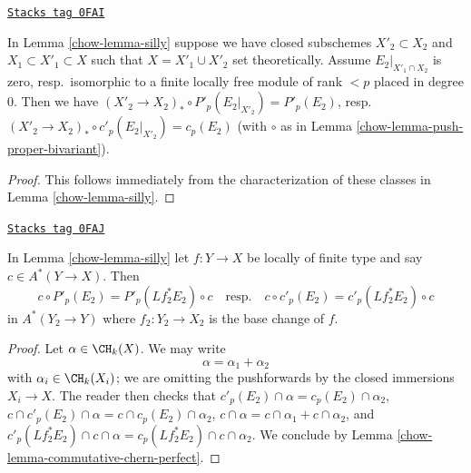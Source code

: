 \begin{lemma}
\label{chow-lemma-silly-shrink}
\href{https://stacks.math.columbia.edu/tag/0FAI}{\texttt{Stacks tag 0FAI}}

In Lemma \ref{chow-lemma-silly} suppose we have closed subschemes
$X'_2 \subset X_2$ and $X_1 \subset X'_1 \subset X$ such that
$X = X'_1 \cup X'_2$ set theoretically. Assume $E_2|_{X'_1 \cap X_2}$
is zero, resp.\ isomorphic to a finite locally free module
of rank $< p$ placed in degree $0$. Then we have
$(X'_2 \to X_2)_* \circ P'_p(E_2|_{X'_2}) = P'_p(E_2)$,
resp.\  $(X'_2 \to X_2)_* \circ c'_p(E_2|_{X'_2}) = c_p(E_2)$
(with $\circ$ as in Lemma \ref{chow-lemma-push-proper-bivariant}).
\end{lemma}

\begin{proof}

This follows immediately from the characterization of these classes
in Lemma \ref{chow-lemma-silly}.
\end{proof}

\begin{lemma}
\label{chow-lemma-silly-commutes}
\href{https://stacks.math.columbia.edu/tag/0FAJ}{\texttt{Stacks tag 0FAJ}}

In Lemma \ref{chow-lemma-silly} let $f : Y \to X$ be locally of finite type
and say $c \in A^*(Y \to X)$. Then
$$
c \circ P'_p(E_2) = P'_p(Lf_2^*E_2) \circ c
\quad\text{resp.}\quad
c \circ c'_p(E_2) = c'_p(Lf_2^*E_2) \circ c
$$
in $A^*(Y_2 \to Y)$ where $f_2 : Y_2 \to X_2$ is the base change of $f$.
\end{lemma}

\begin{proof}

Let $\alpha \in \CH_k(X)$. We may write
$$
\alpha = \alpha_1 + \alpha_2
$$
with $\alpha_i \in \CH_k(X_i)$; we are omitting the pushforwards
by the closed immersions $X_i \to X$. The reader then checks that
$c'_p(E_2) \cap \alpha = c_p(E_2) \cap \alpha_2$,
$c \cap c'_p(E_2) \cap \alpha = c \cap c_p(E_2) \cap \alpha_2$,
$c \cap \alpha = c \cap \alpha_1 + c \cap \alpha_2$, and
$c'_p(Lf_2^*E_2) \cap c \cap \alpha = c_p(Lf_2^*E_2) \cap c \cap \alpha_2$.
We conclude by Lemma \ref{chow-lemma-commutative-chern-perfect}.
\end{proof}

